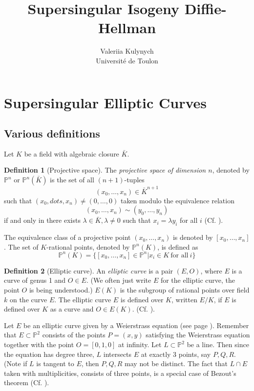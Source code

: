 \documentclass{article}
\title{Supersingular Isogeny Diffie-Hellman}
\author{Valeriia Kulynych\\ Université de Toulon}
\theoremstyle{theorem}
\theoremstyle{definition}
\newtheorem{definition}{Definition}
\begin{document}
\maketitle

\section{Supersingular Elliptic Curves}

\subsection{Various definitions}

Let $K$ be a field with algebraic closure $\bar{K}$.

\begin{definition}[Projective space]
	The \textit{projective space of dimension $n$}, denoted by $\mathbb{P}^n$ or $\mathbb{P}^n(\bar{K})$ is the set of all $(n+1)$-tuples
		\[ (x_0, \dots, x_n) \in \bar{K}^{n+1} \]
	such that $(x_0, dots, x_n) \neq (0, \dots, 0)$ taken modulo the equivalence relation 
		\[ (x_0, \dots, x_n) \sim (y_0, \dots, y_n) \]
	if and only in there exists $\lambda \in \bar{K}, \lambda \neq 0$ such that $x_i = \lambda y_i$ for all $i$ (Cf. \cite[I]{IsogenyCryptoDeFeo}).
\end{definition}


The equivalence class of a projective point $(x_0, \dots, x_n)$ is denoted by $[x_0, \dots, x_n]$. The set of $K$-rational points, denoted by $\mathbb{P}^n(K)$, is defined as 
	\[ \mathbb{P}^n(K) = \{ [x_0, \dots, x_n] \in \mathbb{P}^n | x_i \in K \ \text{for all} \ i \} \]

\begin{definition}[Elliptic curve] 
	An \textit{elliptic curve} is a pair $(E, O)$, where $E$ is a curve of genus 1 and $O \in E$. (We often just write $E$ for the elliptic curve, the point $O$ is being understood.) $E(K)$ is the subgroup of rational points over field $k$ on the curve $E$. The elliptic curve $E$ is defined over $K$, written $E/K$, if $E$ is defined over $K$ as a curve and $O \in E(K)$. (Cf. \cite[III, \S3]{Silverman}).
\end{definition}

Let $E$ be an elliptic curve given by a Weierstrass equation (see page \pageref{WE}). Remember that $E \subset \mathbb{P}^2$ consists of the points $P = (x, y)$ satisfying the Weierstrass equation together with the point $O = [0, 1, 0]$ at infinity. Let $L \subset \mathbb{P}^2$ be a line. Then since the equation has degree three, $L$ intersects $E$ at exactly 3 points, say $P, Q, R$. (Note if $L$ is tangent to $E$, then $P, Q, R$ may not be distinct. The fact that $L \cap E$ taken with multiplicities, consists of three points, is a special case of Bezout's theorem (Cf. \cite[I.7, Corollary 7.8]{Hartshorne}).
\end{document}
